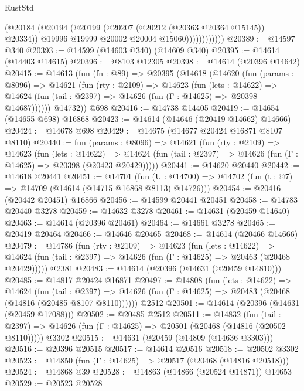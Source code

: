 \begin{lexlean}{RustStd}
\begin{coremodule}
                        (@20184
                          (@20194
                            (@20199 (@20207 (@20212 (@20363 @20364 @15145)) @20334))
                            @19996
                            @19999
                            @20002
                            @20004
                            @15060))))))))))))
@20389 := @14597 @340
@20393 := @14599 (@14603 @340) (@14609 @340)
@20395 := @14614 (@14403 @14615)
@20396 := @8103 @12305
@20398 := @14614 (@20396 @14642)
@20415 := @14613
    (fun (fn : @89) =>
    @20395
      (@14618
        (@14620
          (fun (params : @8096) =>
          @14621
            (fun (rty : @2109) =>
            @14623
              (fun (lets : @14622) =>
              @14624 (fun (tail : @2397) => @14626 (fun (Γ : @14625) => @20398 @14687))))))
        @14732))
    @698
@20416 := @14738 @14405
@20419 := @14654 (@14655 @698) @16868
@20423 := @14614 (@14646 (@20419 @14662) @14666)
@20424 := @14678 @698
@20429 := @14675 (@14677 @20424 @16871 @8107 @8110)
@20440 := fun (params : @8096) =>
  @14621
    (fun (rty : @2109) =>
    @14623
      (fun (lets : @14622) =>
      @14624 (fun (tail : @2397) => @14626 (fun (Γ : @14625) => @20398 (@20423 @20429)))))
@20441 := @14620 @20440
@20442 := @14618 @20441
@20451 := @14701
    (fun (U : @14700) => @14702 (fun (t : @7) => @14709 (@14614 (@14715 @16868 @8113) @14726)))
@20454 := @20416 (@20442 @20451) @16866
@20456 := @14599 @20441 @20451
@20458 := @14783 @20440 @3278
@20459 := @14632 @3278
@20461 := @14631 (@20459 @14640)
@20463 := @14614 (@20396 @20461)
@20464 := @14661 @3278
@20465 := @20419 @20464
@20466 := @14646 @20465
@20468 := @14614 (@20466 @14666)
@20479 := @14786
    (fun (rty : @2109) =>
    @14623
      (fun (lets : @14622) =>
      @14624 (fun (tail : @2397) => @14626 (fun (Γ : @14625) => @20463 (@20468 @20429)))))
    @2381
@20483 := @14614 (@20396 (@14631 (@20459 @14810)))
@20485 := @14817 @20424 @16871
@20497 := @14808
    (fun (lets : @14622) =>
    @14624
      (fun (tail : @2397) =>
      @14626 (fun (Γ : @14625) => @20483 (@20468 (@14816 (@20485 @8107 @8110))))))
    @2512
@20501 := @14614 (@20396 (@14631 (@20459 @17088)))
@20502 := @20485 @2512
@20511 := @14832
    (fun (tail : @2397) => @14626 (fun (Γ : @14625) => @20501 (@20468 (@14816 (@20502 @8110)))))
    @3302
@20515 := @14631 (@20459 (@14809 (@14636 @3303)))
@20516 := @20396 @20515
@20517 := @14614 @20516
@20518 := @20502 @3302
@20523 := @14850 (fun (Γ : @14625) => @20517 (@20468 (@14816 @20518)))
@20524 := @14868 @39
@20528 := @14863 (@14866 (@20524 @14871)) @14653
@20529 := @20523 @20528

\end{coremodule}
\end{lexlean}
